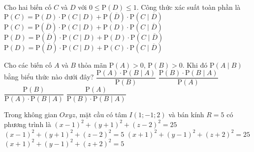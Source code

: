 \begin{ex}%
Cho hai biến cố $C$ và $D$ với $0\leq \mathrm{P}(D)\leq 1$. Công thức xác suất toàn phần là
\choice
{\True $\mathrm{P}(C)=\mathrm{P}(D)\cdot\mathrm{P}(C\mid D)+\mathrm{P}(\overline{D})\cdot\mathrm{P}(C\mid \overline{D})$}
{$\mathrm{P}(C)=\mathrm{P}(\overline{D})\cdot\mathrm{P}(C\mid D)+\mathrm{P}(D)\cdot\mathrm{P}(C\mid \overline{D})$}
{$\mathrm{P}(D)=\mathrm{P}(\overline{D})\cdot\mathrm{P}(C\mid D)+\mathrm{P}(D)\cdot\mathrm{P}(C\mid \overline{D})$}
{$\mathrm{P}(D)=\mathrm{P}(\overline{D})\cdot\mathrm{P}(C\mid D)+\mathrm{P}(C)\cdot\mathrm{P}(C\mid \overline{D})$}
\end{ex}

\begin{ex}%
Cho các biến cố $A$ và $B$ thỏa mãn $\mathrm{P}(A) > 0$, $\mathrm{P}(B) > 0$. Khi đó $\mathrm{P}(A\mid B)$ bằng biểu thức nào dưới đây?
\choice
{\True $\dfrac{\mathrm{P}(A)\cdot \mathrm{P}(B\mid A)}{\mathrm{P}(B)}$}
{$\dfrac{\mathrm{P}(B)\cdot \mathrm{P}(B\mid A)}{\mathrm{P}(A)}$}
{$\dfrac{\mathrm{P}(B)}{\mathrm{P}(A)\cdot \mathrm{P}(B\mid A)}$}
{$\dfrac{\mathrm{P}(A)}{\mathrm{P}(B)\cdot \mathrm{P}(B\mid A)}$}
\end{ex}

\begin{ex}%
Trong không gian $Oxyz$, mặt cầu có tâm $I(1;-1; 2)$ và bán kính $R=5$ có phương trình là
\choice
{\True $(x-1)^2+(y+1)^2+(z-2)^2=25$}
{$(x-1)^2+(y+1)^2+(z-2)^2=5$}
{$(x+1)^2+(y-1)^2+(z+2)^2=25$}
{$(x+1)^2+(y-1)^2+(z+2)^2=5$}
\end{ex}

